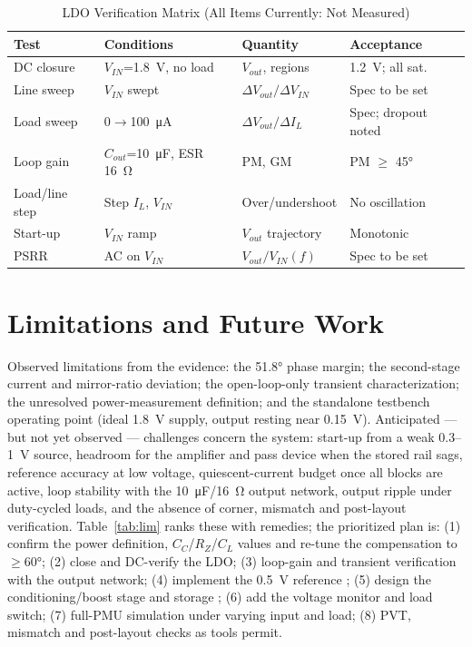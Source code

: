 \documentclass[conference]{IEEEtran}
\begin{document}
\begin{table}[!t]
\caption{LDO Verification Matrix (All Items Currently: Not Measured)}
\label{tab:vm}
\centering\footnotesize
\begin{tabular}{@{}llll@{}}
\toprule
Test & Conditions & Quantity & Acceptance \\
\midrule
DC closure & $V_{IN}$=\SI{1.8}{\volt}, no load & $V_{out}$, regions & \SI{1.2}{\volt}; all sat. \\
Line sweep & $V_{IN}$ swept & $\Delta V_{out}/\Delta V_{IN}$ & Spec to be set \\
Load sweep & 0$\to$\SI{100}{\micro\ampere} & $\Delta V_{out}/\Delta I_L$ & Spec; dropout noted \\
Loop gain & $C_{out}$=\SI{10}{\micro\farad}, ESR \SI{16}{\ohm} & PM, GM & PM $\ge$ \ang{45} \\
Load/line step & Step $I_L$, $V_{IN}$ & Over/undershoot & No oscillation \\
Start-up & $V_{IN}$ ramp & $V_{out}$ trajectory & Monotonic \\
PSRR & AC on $V_{IN}$ & $V_{out}/V_{IN}(f)$ & Spec to be set \\
\bottomrule
\end{tabular}
\end{table}

\section{Limitations and Future Work}
Observed limitations from the evidence: the \ang{51.8} phase margin; the
second-stage current and mirror-ratio deviation; the open-loop-only transient
characterization; the unresolved power-measurement definition; and the
standalone testbench operating point (ideal \SI{1.8}{\volt} supply, output
resting near \SI{0.15}{\volt}). Anticipated --- but not yet observed ---
challenges concern the system: start-up from a weak 0.3--1~\si{\volt} source,
headroom for the amplifier and pass device when the stored rail sags,
reference accuracy at low voltage, quiescent-current budget once all blocks
are active, loop stability with the \SI{10}{\micro\farad}/\SI{16}{\ohm}
output network, output ripple under duty-cycled loads, and the absence of
corner, mismatch and post-layout verification. Table~\ref{tab:lim} ranks
these with remedies; the prioritized plan is: (1) confirm the power
definition, $C_C$/$R_Z$/$C_L$ values and re-tune the compensation to
$\ge$\ang{60}; (2) close and DC-verify the LDO; (3) loop-gain and transient
verification with the output network; (4) implement the \SI{0.5}{\volt}
reference \cite{seok2012}; (5) design the conditioning/boost stage and
storage \cite{seeman2008}; (6) add the voltage monitor and load switch;
(7) full-PMU simulation under varying input and load; (8) PVT, mismatch and
post-layout checks as tools permit.
\end{document}
